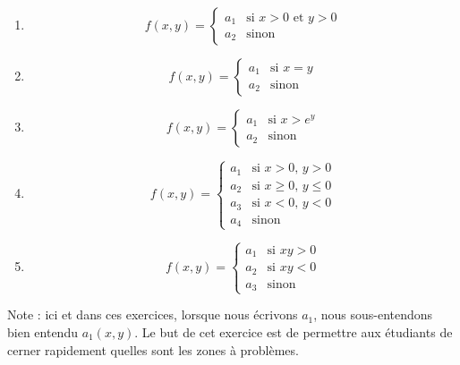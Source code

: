 \begin{exercice}
\begin{multicols}{2}
\begin{enumerate}
	\item
	\begin{equation}
		f(x,y)=
		\begin{cases}
			a_1	&	\text{si $x>0$ et $y>0$}\\
			a_2	&	 \text{sinon}
		\end{cases}
	\end{equation}
	\item
	\begin{equation}
		f(x,y)=
		\begin{cases}
			a_1	&	\text{si $x=y$}\\
			a_2	&	 \text{sinon}
		\end{cases}
	\end{equation}
	\item
	\begin{equation}
		f(x,y)=
		\begin{cases}
			a_1	&	\text{si $x>e^y$}\\
			a_2	&	 \text{sinon}
		\end{cases}
	\end{equation}
	\item
	\begin{equation}
		f(x,y)=
		\begin{cases}
			a_1	&	\text{si $x>0$, $y>0$}\\
			a_2	&	 \text{si $x\geq 0$, $y\leq 0$}\\
			a_3	&	 \text{si $x<0$, $y<0$}\\
			a_4	&	 \text{sinon}
		\end{cases}
	\end{equation}
	\item
	\begin{equation}
		f(x,y)=
		\begin{cases}
			a_1	&	\text{si $xy>0$}\\
			a_2	&	 \text{si $xy<0$}\\
			a_3	&	 \text{sinon}
		\end{cases}
	\end{equation}
\end{enumerate}
\end{multicols}
Note : ici et dans ces exercices, lorsque nous écrivons \og $a_1$\fg, nous sous-entendons bien entendu \og $a_1(x,y)$\fg. Le but de cet exercice est de permettre aux étudiants de cerner rapidement quelles sont les zones à problèmes.

\end{exercice}
